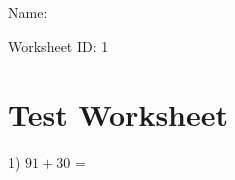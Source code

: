 \documentclass[12pt]{article}
\begin{document}

\begin{flushright}
Name: \underline{\hspace{2.5 in}}
\end{flushright}
\begin{flushright}
Worksheet ID: 1
\end{flushright}
\section*{Test Worksheet}

1) $91 + 30$ = \underline{\hspace{2 in}}
\end{document}
